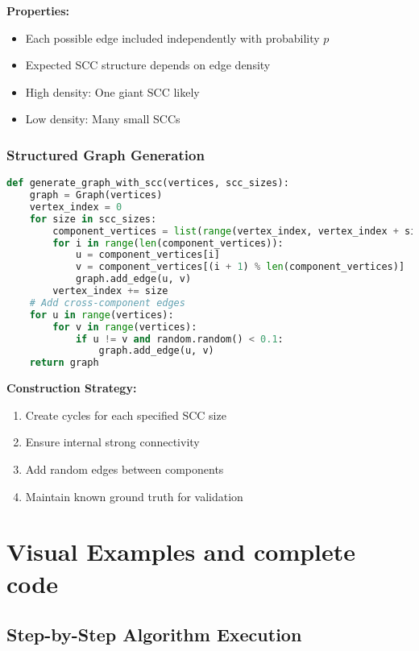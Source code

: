 \documentclass{book}
\theoremstyle{definition}
\begin{document}
\textbf{Properties:}
\begin{itemize}
    \item Each possible edge included independently with probability $p$
    \item Expected SCC structure depends on edge density
    \item High density: One giant SCC likely
    \item Low density: Many small SCCs
\end{itemize}

\subsection{Structured Graph Generation}

\begin{lstlisting}[language=Python]
def generate_graph_with_scc(vertices, scc_sizes):
    graph = Graph(vertices)
    vertex_index = 0
    for size in scc_sizes:
        component_vertices = list(range(vertex_index, vertex_index + size))
        for i in range(len(component_vertices)):
            u = component_vertices[i]
            v = component_vertices[(i + 1) % len(component_vertices)]
            graph.add_edge(u, v)
        vertex_index += size
    # Add cross-component edges
    for u in range(vertices):
        for v in range(vertices):
            if u != v and random.random() < 0.1:
                graph.add_edge(u, v)
    return graph
\end{lstlisting}

\textbf{Construction Strategy:}
\begin{enumerate}
    \item Create cycles for each specified SCC size
    \item Ensure internal strong connectivity
    \item Add random edges between components
    \item Maintain known ground truth for validation
\end{enumerate}


\chapter{Visual Examples and complete code}

\section{Step-by-Step Algorithm Execution}
\end{document}
